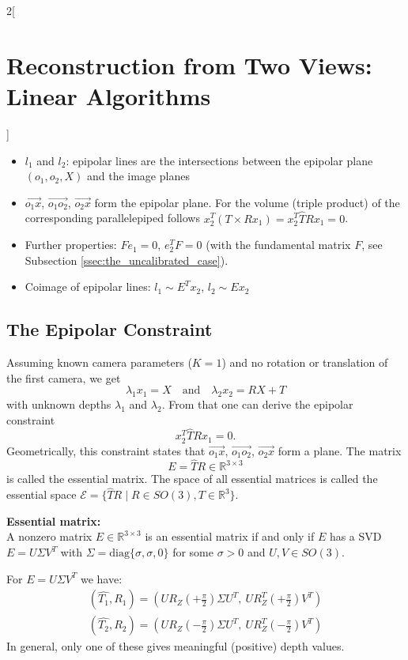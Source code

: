 \documentclass[oneside,fontsize=11pt,paper=a4]{scrartcl}
\begin{document}
\begin{multicols}{2}[\section{Reconstruction from Two Views: Linear Algorithms}]
\begin{itemize}
    \item $l_1$ and $l_2$: epipolar lines are the intersections between the epipolar plane $(o_1,o_2,X)$ and the image planes
    \item $\overrightarrow{o_1x}$, $\overrightarrow{o_1o_2}$, $\overrightarrow{o_2x}$ form the epipolar plane. For the volume (triple product) of the corresponding parallelepiped follows $x_2^T(T \times R x_1) = x_2^T \hat{T} R x_1 = 0$.
    \item Further properties: $F e_1 = 0$, $e_2^T F = 0$ (with the fundamental matrix $F$, see Subsection \ref{ssec:the_uncalibrated_case}).
    \item Coimage of epipolar lines: $l_1 \sim E^T x_2$, $l_2 \sim E x_2$
\end{itemize}

\subsection{The Epipolar Constraint}
Assuming known camera parameters ($K=1$) and no rotation or translation of the first camera, we get
\begin{equation*}
    \lambda_1 x_1 = X \quad \text{and} \quad \lambda_2 x_2 = RX+T
\end{equation*}
with unknown depths $\lambda_1$ and $\lambda_2$.
From that one can derive the epipolar constraint
\begin{equation*}
    x_2^T \hat{T} R x_1 = 0.
\end{equation*}
Geometrically, this constraint states that $\overrightarrow{o_1x}$, $\overrightarrow{o_1o_2}$, $\overrightarrow{o_2x}$ form a plane.
The matrix
\begin{equation*}
    E = \hat{T}R \in \mathbb{R}^{3 \times 3}
\end{equation*}
is called the essential matrix.
The space of all essential matrices is called the essential space $\mathcal{E} = \{\hat{T} R \; \vert \; R \in SO(3), T \in \mathbb{R}^3\}$. \par
\vspace{3mm}

\textbf{Essential matrix:}\\
A nonzero matrix $E \in \mathbb{R}^{3 \times 3}$ is an essential matrix if and only if $E$ has a SVD $E = U \Sigma V^T$ with $\Sigma = \text{diag}\{\sigma, \sigma, 0\}$ for some $\sigma > 0$ and $U, V \in SO(3)$.\par

For $E = U \Sigma V^T$ we have:
\begin{equation*}
\begin{split}
    (\hat{T_1}, R_1) = \left(U R_Z (+\frac{\pi}{2})\Sigma U^T, \ U R_Z^T (+\frac{\pi}{2})V^T \right)\\
    (\hat{T_2}, R_2) = \left(U R_Z (-\frac{\pi}{2})\Sigma U^T, \ U R_Z^T (-\frac{\pi}{2})V^T \right)
\end{split}
\end{equation*}
In general, only one of these gives meaningful (positive) depth values.


\end{multicols}
\end{document}
